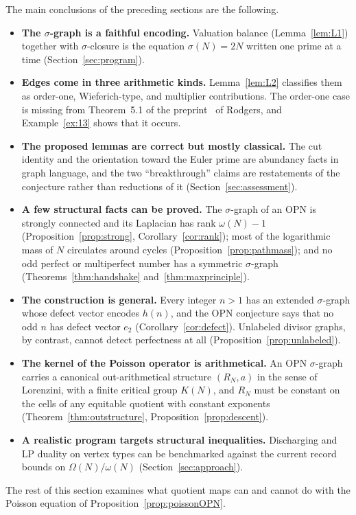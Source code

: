\documentclass[11pt]{article}
\theoremstyle{definition}
\theoremstyle{remark}
\begin{document}
The main conclusions of the preceding sections are the following.
\begin{itemize}[leftmargin=1.5em]
\item \textbf{The $\sigma$-graph is a faithful encoding.}  Valuation balance
  (Lemma~\ref{lem:L1}) together with $\sigma$-closure is the equation
  $\sigma(N)=2N$ written one prime at a time
  (Section~\ref{sec:program}).
\item \textbf{Edges come in three arithmetic kinds.}  Lemma~\ref{lem:L2}
  classifies them as order-one, Wieferich-type, and multiplier
  contributions.  The order-one case is missing from Theorem~5.1
  of the preprint~\cite{Rodgers} of Rodgers, and Example~\ref{ex:13}
  shows that it occurs.
\item \textbf{The proposed lemmas are correct but mostly classical.}  The
  cut identity and the orientation toward the Euler prime are abundancy
  facts in graph language, and the two ``breakthrough'' claims are
  restatements of the conjecture rather than reductions of it
  (Section~\ref{sec:assessment}).
\item \textbf{A few structural facts can be proved.}  The $\sigma$-graph of
  an OPN is strongly connected and its Laplacian has rank $\omega(N)-1$
  (Proposition~\ref{prop:strong}, Corollary~\ref{cor:rank}); most of the
  logarithmic mass of $N$ circulates around cycles
  (Proposition~\ref{prop:pathmass}); and no odd perfect or multiperfect
  number has a symmetric $\sigma$-graph (Theorems~\ref{thm:handshake}
  and~\ref{thm:maxprinciple}).
\item \textbf{The construction is general.}  Every integer $n>1$ has an
  extended $\sigma$-graph whose defect vector encodes $h(n)$, and the OPN
  conjecture says that no odd $n$ has defect vector $e_2$
  (Corollary~\ref{cor:defect}).  Unlabeled divisor graphs, by contrast, cannot
  detect perfectness at all (Proposition~\ref{prop:unlabeled}).
\item \textbf{The kernel of the Poisson operator is arithmetical.}  An OPN
  $\sigma$-graph carries a canonical out-arithmetical structure
  $(R_N,a)$ in the sense of Lorenzini, with a finite critical group $K(N)$,
  and $R_N$ must be constant on the cells of any equitable quotient with
  constant exponents (Theorem~\ref{thm:outstructure},
  Proposition~\ref{prop:descent}).
\item \textbf{A realistic program targets structural inequalities.}
  Discharging and LP duality on vertex types can be benchmarked against the
  current record bounds on $\Omega(N)/\omega(N)$
  (Section~\ref{sec:approach}).
\end{itemize}
The rest of this section examines what quotient maps can and cannot do with
the Poisson equation of Proposition~\ref{prop:poissonOPN}.
\end{document}
